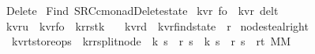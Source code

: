 %
\begin{isabellebody}%
%
%
\isadelimtheory
%
\endisadelimtheory
%
\isatagtheory
{}\isamarkupfalse%
\ Delete{}\isanewline
{}\ Find\ {\isachardoublequoteopen}{\isachardollar}SRC{\isacharslash}c{\isacharunderscore}monad{\isacharslash}Delete{\isacharunderscore}state{\isachardoublequoteclose}\isanewline
{}%
\endisatagtheory
{\isafoldtheory}%
%
\isadelimtheory
\isanewline
%
\endisadelimtheory
\isanewline
\isanewline
\isanewline
\isanewline
\isanewline
\isanewline
\isanewline
{}\isamarkupfalse%
\ {\isacharparenleft}{\isacharprime}k{\isacharcomma}{\isacharprime}v{\isacharcomma}{\isacharprime}r{\isacharparenright}\ fo\ {\isacharequal}\ {\isachardoublequoteopen}{\isacharparenleft}{\isacharprime}k{\isacharcomma}{\isacharprime}v{\isacharcomma}{\isacharprime}r{\isacharparenright}\ del{\isacharunderscore}t{\isachardoublequoteclose}\ \ \isanewline
{}\isamarkupfalse%
\ {\isacharparenleft}{\isacharprime}k{\isacharcomma}{\isacharprime}v{\isacharcomma}{\isacharprime}r{\isacharparenright}u\ {\isacharequal}\ {\isachardoublequoteopen}{\isacharparenleft}{\isacharprime}k{\isacharcomma}{\isacharprime}v{\isacharcomma}{\isacharprime}r{\isacharparenright}fo\ {\isacharasterisk}\ {\isacharparenleft}{\isacharprime}k{\isacharcomma}{\isacharprime}r{\isacharparenright}rstk{\isachardoublequoteclose}\ \ \isanewline
{}\isamarkupfalse%
\ {\isacharparenleft}{\isacharprime}k{\isacharcomma}{\isacharprime}v{\isacharcomma}{\isacharprime}r{\isacharparenright}d\ {\isacharequal}\ {\isachardoublequoteopen}{\isacharparenleft}{\isacharprime}k{\isacharcomma}{\isacharprime}v{\isacharcomma}{\isacharprime}r{\isacharparenright}find{\isacharunderscore}state\ {\isacharasterisk}\ {\isacharprime}r{\isachardoublequoteclose}\isanewline
\isanewline
\isanewline
\isanewline
\isanewline
\isanewline
\isanewline
\isanewline
\isanewline
\isanewline
\isanewline
\isanewline
\isanewline
{}\isamarkupfalse%
\ node{\isacharunderscore}steal{\isacharunderscore}right\ {\isacharcolon}{\isacharcolon}\ \isanewline
\ \ {\isachardoublequoteopen}{\isacharparenleft}{\isacharprime}k{\isacharcomma}{\isacharprime}v{\isacharcomma}{\isacharprime}r{\isacharcomma}{\isacharprime}t{\isacharparenright}store{\isacharunderscore}ops\ {\isasymRightarrow}\ {\isacharparenleft}{\isacharprime}k{\isacharcomma}{\isacharprime}r{\isacharparenright}rsplit{\isacharunderscore}node\ {\isasymRightarrow}\ {\isacharparenleft}{\isacharprime}k\ s\ {\isacharasterisk}\ {\isacharprime}r\ s{\isacharparenright}\ {\isasymRightarrow}\ {\isacharparenleft}{\isacharprime}k\ s\ {\isacharasterisk}\ {\isacharprime}r\ s{\isacharparenright}\ {\isasymRightarrow}\ {\isacharparenleft}{\isacharprime}r{\isacharcomma}{\isacharprime}t{\isacharparenright}\ MM{\isachardoublequoteclose}\ \isanewline

\end{isabellebody}
